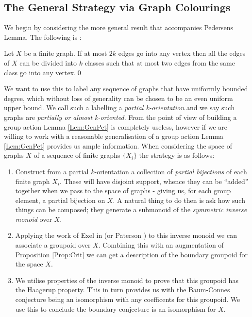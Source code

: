 \subsection{The General Strategy via Graph Colourings}

We begin by considering the more general result that accompanies Pedersens Lemma. The following is \cite[Theorem 6, Chapter XI]{MR1035708}:

\begin{lemma}\label{Lem:GenPet}
Let $X$ be a finite graph. If at most $2k$ edges go into any vertex then all the edges of $X$ can be divided into $k$ classes such that at most two edges from the same class go into any vertex.\qed
\end{lemma}

We want to use this to label any sequence of graphs that have uniformly bounded degree, which without loss of generality can be chosen to be an even uniform upper bound. We call such a labelling a \textit{partial k-orientation} and we say such graphs are \textit{partially or almost k-oriented}. From the point of view of building a group action Lemma \ref{Lem:GenPet} is completely useless, however if we are willing to work with a reasonable generalisation of a group action Lemma \ref{Lem:GenPet} provides us ample information. When considering the space of graphs $X$ of a sequence of finite graphs $\lbrace X_{i} \rbrace$ the strategy is as follows: 
\begin{enumerate}
\item Construct from a partial $k$-orientation a collection of \textit{partial bijections} of each finite graph $X_{i}$. These will have disjoint support, whence they can be ``added'' together when we pass to the space of graphs - giving us, for each group element, a partial bijection on $X$. A natural thing to do then is ask how such things can be composed; they generate a submonoid of the \textit{symmetric inverse monoid} over $X$.

\item Applying the work of Exel in \cite{MR2419901} (or Paterson \cite{MR1724106}) to this inverse monoid we can associate a groupoid over $X$. Combining this with an augmentation of Proposition \ref{Prop:Crit} we can get a description of the boundary groupoid for the space $X$.

\item We utilise properties of the inverse monoid to prove that this groupoid has the Haagerup property. This in turn provides us with the Baum-Connes conjecture being an isomorphism with any coefficents for this groupoid. We use this to conclude the boundary conjecture is an isomorphism for $X$.
\end{enumerate}

